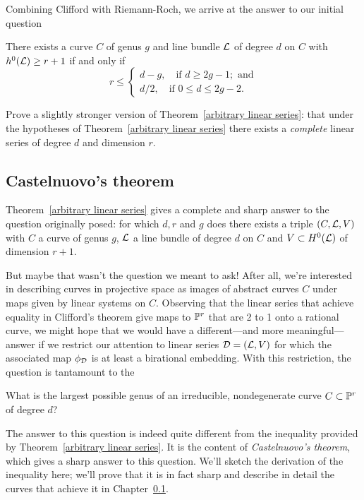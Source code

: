 Combining Clifford with Riemann-Roch, we arrive at the answer to our initial question

\begin{theorem}\label{arbitrary linear series}
There exists a curve $C$ of genus $g$ and line bundle ${\mathcal L}$ of degree $d$ on $C$ with $h^0({\mathcal L}) \geq r+1$ if and only if
$$
r \leq
\begin{cases}
d-g, \quad \text{if } d \geq 2g-1; \text{ and} \\
d/2,  \quad \text{if } 0 \leq d \leq 2g-2.
\end{cases}
$$
\end{theorem}

\begin{exercise}
Prove a slightly stronger version of Theorem~\ref{arbitrary linear series}: that under the hypotheses of Theorem~\ref{arbitrary linear series} there exists a \emph{complete} linear series of degree $d$ and dimension $r$.
\end{exercise}

\subsection{Castelnuovo's theorem}

Theorem~\ref{arbitrary linear series} gives a complete and sharp answer to the question originally posed: for which $d,r$ and $g$ does there exists a triple $(C,{\mathcal L},V)$ with $C$ a curve of genus $g$, ${\mathcal L}$ a line bundle of degree $d$ on $C$ and $V \subset H^0({\mathcal L})$ of dimension $r+1$. 

But maybe that wasn't the question we meant to ask! After all, we're interested in describing curves in projective space as images of abstract curves $C$ under maps given by linear systems on $C$. Observing that the linear series that achieve equality in Clifford's theorem give maps to ${\mathbb P}^r$ that are 2 to 1 onto a rational curve, we might hope that we would have a different---and more meaningful---answer if we  restrict our attention to linear series ${\cal D} = ({\mathcal L},V)$ for which the associated map $\phi_{\cal D}$ is at least a birational embedding.  With this restriction, the question is tantamount to the

\begin{question}
What is the largest possible genus of an irreducible, nondegenerate curve $C \subset {\mathbb P}^r$ of degree $d$?
\end{question}

The answer to this question is indeed quite different from the inequality provided by Theorem~\ref{arbitrary linear series}. It is the content of \emph{Castelnuovo's theorem}, which gives a sharp answer to this question. We'll sketch the derivation of the inequality here; we'll prove that it is in fact sharp and describe in detail  the curves that achieve it in Chapter~\ref{}.

